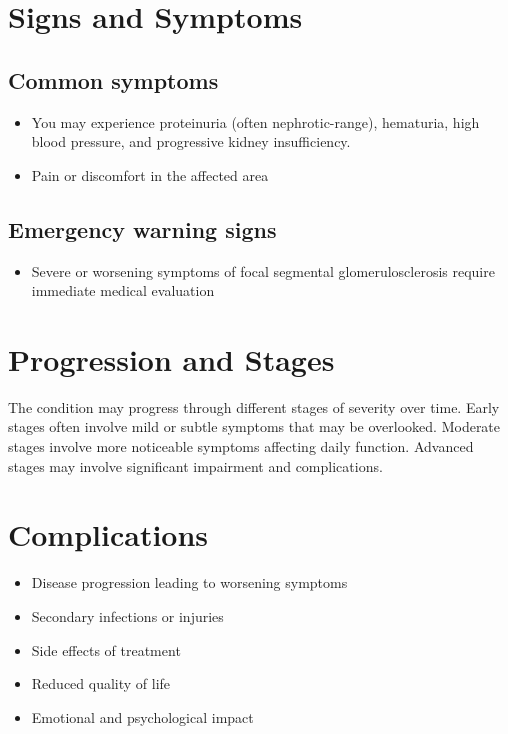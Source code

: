 \section{Signs and Symptoms}

\subsection{Common symptoms}
\begin{itemize}[noitemsep]
  \item You may experience proteinuria (often nephrotic-range), hematuria, high blood pressure, and progressive kidney insufficiency.
  \item Pain or discomfort in the affected area
  \end{itemize}

\subsection{Emergency warning signs}
\begin{itemize}[noitemsep]
  \item Severe or worsening symptoms of focal segmental glomerulosclerosis require immediate medical evaluation
\end{itemize}
\section{Progression and Stages}
The condition may progress through different stages of severity over time. Early stages often involve mild or subtle symptoms that may be overlooked. Moderate stages involve more noticeable symptoms affecting daily function. Advanced stages may involve significant impairment and complications.
\section{Complications}
\begin{itemize}[noitemsep]
  \item Disease progression leading to worsening symptoms
  \item Secondary infections or injuries
  \item Side effects of treatment
  \item Reduced quality of life
  \item Emotional and psychological impact
\end{itemize}
